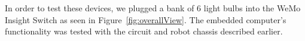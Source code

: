 In order to test these devices, we plugged a bank of 6 light bulbs into the WeMo
Insight Switch as seen in Figure~\ref{fig:overallView}. The embedded computer's
functionality was tested with the circuit and robot chassis described earlier.

